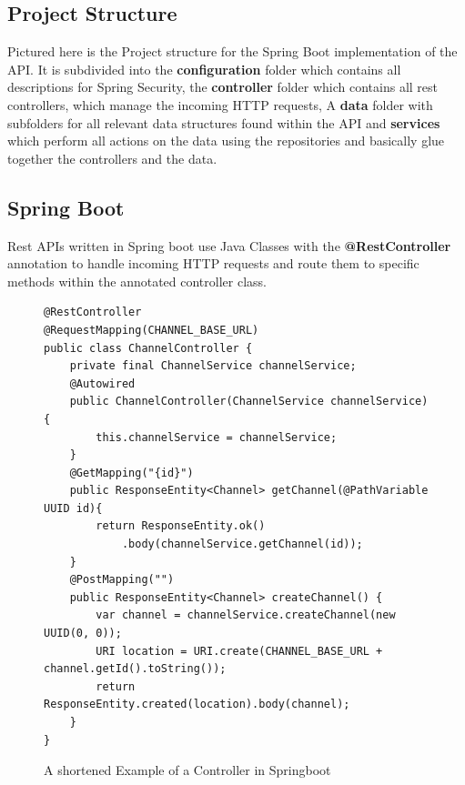\documentclass[a4paper,12pt]{article}
\begin{document}
	\subsection{Project Structure}
	\label{subsec:project_structure_java}
	\begin{minipage}{0.4\textwidth}
	\clearpage
	\end{minipage}%
	\begin{minipage}{0.6\textwidth}
		Pictured here is the Project structure for the Spring Boot implementation of the API. It is subdivided into the 
		\textbf{configuration} folder which contains all descriptions for Spring Security, the 
		\textbf{controller} folder which contains all rest controllers, which manage the incoming HTTP requests, A
		\textbf{data} folder with subfolders for all relevant data structures found within the API and
		\textbf{services} which perform all actions on the data using the repositories and basically glue together
		the controllers and the data.
	\end{minipage}%
	
	\newpage
	\subsection{Spring Boot}
	\label{subsec:spring_boot}
	Rest APIs written in Spring boot use Java Classes with the \textbf{@RestController} annotation to
	handle incoming HTTP requests and route them to specific methods within the annotated controller class.
	\begin{figure}[ht!]
		\begin{lstlisting}
@RestController
@RequestMapping(CHANNEL_BASE_URL)
public class ChannelController {
	private final ChannelService channelService;
	@Autowired
	public ChannelController(ChannelService channelService) {
		this.channelService = channelService;
	}
	@GetMapping("{id}")
	public ResponseEntity<Channel> getChannel(@PathVariable UUID id){
		return ResponseEntity.ok()
			.body(channelService.getChannel(id));
	}
	@PostMapping("")
    public ResponseEntity<Channel> createChannel() {
        var channel = channelService.createChannel(new UUID(0, 0));
        URI location = URI.create(CHANNEL_BASE_URL + channel.getId().toString());
        return ResponseEntity.created(location).body(channel);
    }
}
		\end{lstlisting}
		\caption[controller java shortened]{A shortened Example of a Controller in Springboot}
	\end{figure}
\end{document}
